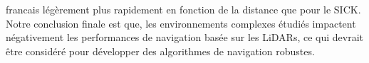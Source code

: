 \begin{otherlanguage*}{francais}
légèrement plus rapidement en fonction de la distance que pour le SICK. Notre conclusion finale est que, les environnements complexes étudiés impactent négativement les performances de navigation basée sur les LiDARs, ce qui devrait être considéré pour développer des algorithmes de navigation robustes.


\end{otherlanguage*}
